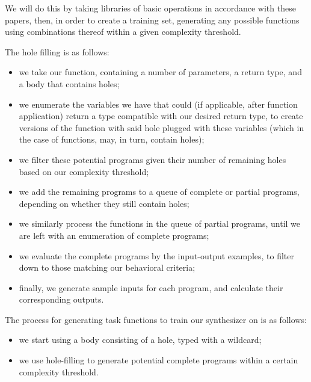 \documentclass{article}
\begin{document}
We will do this by taking libraries of basic operations in accordance with these papers, then, in order to create a training set, generating any possible functions using combinations thereof within a given complexity threshold.

The hole filling is as follows:
\begin{itemize}
    \item we take our function, containing a number of parameters, a return type, and a body that contains holes;
    \item we enumerate the variables we have that could (if applicable, after function application) return a type compatible with our desired return type, to create versions of the function with said hole plugged with these variables (which in the case of functions, may, in turn, contain holes);
    \item we filter these potential programs given their number of remaining holes based on our complexity threshold;
    \item we add the remaining programs to a queue of complete or partial programs, depending on whether they still contain holes;
    \item we similarly process the functions in the queue of partial programs, until we are left with an enumeration of complete programs;
    \item we evaluate the complete programs by the input-output examples, to filter down to those matching our behavioral criteria;
    \item finally, we generate sample inputs for each program, and calculate their corresponding outputs.
\end{itemize}

The process for generating task functions to train our synthesizer on is as follows:
\begin{itemize}
    \item we start using a body consisting of a hole, typed with a wildcard;
    \item we use hole-filling to generate potential complete programs within a certain complexity threshold.
\end{itemize}
\end{document}
